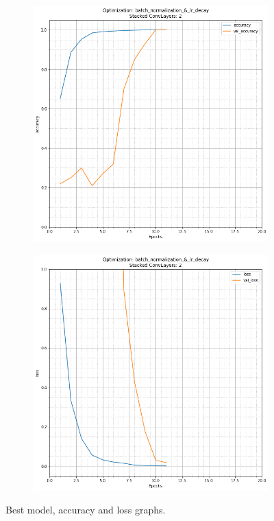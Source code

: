 \documentclass{article}
\begin{document}
\begin{figure}[H]
    \centering
    \begin{subfigure}[b]{0.45\textwidth}
        \centering
        \includegraphics[width=\textwidth]{best_model_accuracy}
    \end{subfigure}
    \begin{subfigure}[b]{0.45\textwidth}
        \centering
        \includegraphics[width=\textwidth]{best_model_loss}
    \end{subfigure}
    \caption{Best model, accuracy and loss graphs.}
    \label{fig:best_model_graphs}
\end{figure}
\end{document}
